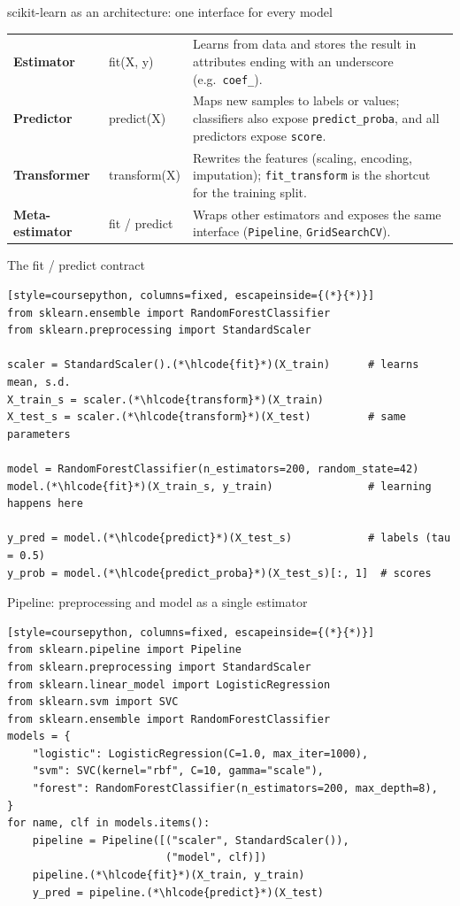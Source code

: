 \begin{frame}{scikit-learn as an architecture: one interface for every model}
\begin{tabularx}{\textwidth}{>{\bfseries}l >{\ttfamily}l X}
Estimator & fit(X, y) & Learns from data and stores the result in attributes ending with an underscore (e.g.\ \texttt{coef\_}). \\
\addlinespace[0.3em]
Predictor & predict(X) & Maps new samples to labels or values; classifiers also expose \texttt{predict\_proba}, and all predictors expose \texttt{score}. \\
\addlinespace[0.3em]
Transformer & transform(X) & Rewrites the features (scaling, encoding, imputation); \texttt{fit\_transform} is the shortcut for the training split. \\
\addlinespace[0.3em]
Meta-estimator & fit / predict & Wraps other estimators and exposes the same interface (\texttt{Pipeline}, \texttt{GridSearchCV}). \\
\bottomrule
\end{tabularx}
\coursefooter
\end{frame}

\begin{frame}[fragile]{The fit / predict contract}
\begin{lstlisting}[style=coursepython, columns=fixed, escapeinside={(*}{*)}]
from sklearn.ensemble import RandomForestClassifier
from sklearn.preprocessing import StandardScaler

scaler = StandardScaler().(*\hlcode{fit}*)(X_train)      # learns mean, s.d.
X_train_s = scaler.(*\hlcode{transform}*)(X_train)
X_test_s = scaler.(*\hlcode{transform}*)(X_test)         # same parameters

model = RandomForestClassifier(n_estimators=200, random_state=42)
model.(*\hlcode{fit}*)(X_train_s, y_train)               # learning happens here

y_pred = model.(*\hlcode{predict}*)(X_test_s)            # labels (tau = 0.5)
y_prob = model.(*\hlcode{predict_proba}*)(X_test_s)[:, 1]  # scores
\end{lstlisting}
\coursefooter
\end{frame}

\begin{frame}[fragile]{Pipeline: preprocessing and model as a single estimator}
\begin{lstlisting}[style=coursepython, columns=fixed, escapeinside={(*}{*)}]
from sklearn.pipeline import Pipeline
from sklearn.preprocessing import StandardScaler
from sklearn.linear_model import LogisticRegression
from sklearn.svm import SVC
from sklearn.ensemble import RandomForestClassifier
models = {
    "logistic": LogisticRegression(C=1.0, max_iter=1000),
    "svm": SVC(kernel="rbf", C=10, gamma="scale"),
    "forest": RandomForestClassifier(n_estimators=200, max_depth=8),
}
for name, clf in models.items():
    pipeline = Pipeline([("scaler", StandardScaler()),
                         ("model", clf)])
    pipeline.(*\hlcode{fit}*)(X_train, y_train)
    y_pred = pipeline.(*\hlcode{predict}*)(X_test)
\end{lstlisting}
\coursefooter
\end{frame}


